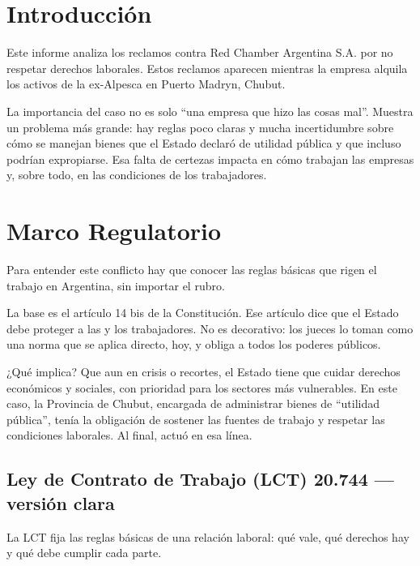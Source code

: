 \documentclass[]{informeutn}
\begin{document}
\maketitle


\chapter{Introducción}
  Este informe analiza los reclamos contra Red Chamber Argentina S.A. por no respetar derechos laborales. Estos reclamos
  aparecen mientras la empresa alquila los activos de la ex-Alpesca en Puerto Madryn, Chubut.
  
  La importancia del caso no es solo “una empresa que hizo las cosas mal”. Muestra un problema más grande: hay reglas poco
  claras y mucha incertidumbre sobre cómo se manejan bienes que el Estado declaró de utilidad pública y que incluso 
  podrían expropiarse. Esa falta de certezas impacta en cómo trabajan las empresas y, sobre todo, en las condiciones de 
  los trabajadores.

\chapter{Marco Regulatorio}
  Para entender este conflicto hay que conocer las reglas básicas que rigen el trabajo en Argentina, sin importar el rubro.
  
  La base es el artículo 14 bis de la Constitución. Ese artículo dice que el Estado debe proteger a las y los 
  trabajadores. No es decorativo: los jueces lo toman como una norma que se aplica directo, hoy, y obliga a todos los 
  poderes públicos.
  
  ¿Qué implica? Que aun en crisis o recortes, el Estado tiene que cuidar derechos económicos y sociales, con prioridad
  para los sectores más vulnerables. En este caso, la Provincia de Chubut, encargada de administrar bienes de “utilidad 
  pública”, tenía la obligación de sostener las fuentes de trabajo y respetar las condiciones laborales. Al final, actuó
  en esa línea.

  \section{Ley de Contrato de Trabajo (LCT) 20.744 — versión clara}

    La LCT fija las reglas básicas de una relación laboral: qué vale, qué derechos hay y qué debe cumplir cada parte.
\end{document}
